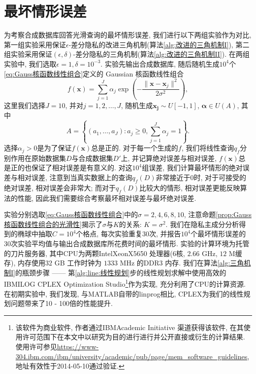 \section{最坏情形误差} %
\label{sec:最坏情形误差}
为考察合成数据库回答光滑查询的最坏情形误差, 我们进行以下两组实验作为对比, 第一组实验采用保证$\epsilon$-差分隐私的改进三角机制(算法\ref{alg:改进的三角机制I}), 第二组实验采用保证$(\epsilon, \delta)$-差分隐私的三角机制(算法\ref{alg:改进的三角机制II}). 在两组实验中, 我们选取$\epsilon = 1, \delta = 10^{-3}$. 实验先输出合成数据库, 随后随机生成$10^4$个\eqref{eq:Gauss核函数线性组合}定义的 Gaussian 核函数线性组合
\[
  f(\mathbf{x}) = \sum_{j = 1}^J \alpha_j \exp\left(-\frac{\|\mathbf{x} - \mathbf{x}_j\|^2}{2\sigma^2}\right), 
\]
这里我们选择$J = 10$, 并对$j = 1, 2, \dots, J$, 随机生成$\mathbf{x_j} \sim U[-1, 1]$, $\boldsymbol{\alpha} \in U(A)$, 其中
\[
  A = \left\{(a_1, \dots, a_J)\colon a_j\ge 0, \sum_{j=1}^J \alpha_j = 1 \right\}.
\]
选择$\alpha_j > 0$是为了保证$f(\mathbf{x})$总是正的. 对于每一个生成的$f$, 我们将线性查询$q_f$分别作用在原始数据集$D$与合成数据集$D'$上, 并记算绝对误差与相对误差, $f(\mathbf{x})$总是正的也保证了相对误差是有意义的.  对这$10^4$组误差, 我们计算最坏情形的绝对误差与相对误差, 注意到当真实数据上的查询$q_f(D)$非常接近于$0$时, 对于可接受的绝对误差, 相对误差会非常大; 而对于$q_f(D)$比较大的情形, 相对误差更能反映算法的性能, 因此我们需要综合考察最坏相对误差与最坏绝对误差. 

实验分别选取\eqref{eq:Gauss核函数线性组合}中的$\sigma = 2, 4, 6, 8, 10$, 注意命题\ref{prop:Gauss 核函数线性组合的光滑性}揭示了$\sigma$与$K$的关系: $K = \sigma^2$. 我们在隐私主成分分析得到的椭球中抽取$C = 10^4$个格点, 每次实验重复$30$次, 并报告$10^4$个最坏情形误差的$30$次实验平均值与输出合成数据库所花费时间的最坏情形. 实验的计算环境为托管的刀片服务器, 其中CPU为两颗Intel\textregistered Xeon\textregistered X5650 处理器($6$核, $2.66$ GHz, $12$ M缓存), 内存使用$32$ GB 工作时钟为 $1333$ MHz 的DDR3 内存. 我们在算法\ref{alg:三角机制I}的瓶颈步骤 ------ 第\ref{alg:line:线性规划}步的线性规划求解中使用高效的IBM\textregistered ILOG CPLEX Optimization Studio\footnote{该软件为商业软件, 作者通过IBM\textregistered Academic Initiative 渠道获得该软件, 在其使用许可范围下在本文中以研究为目的进行进行并公开直接或衍生的计算结果. 使用许可参见\url{https://www-304.ibm.com/ibm/university/academic/pub/page/mem_software_guidelines}, 地址有效性于2014-05-10通过验证.}作为实现, 充分利用了CPU的计算资源. 在初期实验中, 我们发现, 与MATLAB自带的{\ttfamily linprog}相比, CPLEX为我们的线性规划问题带来了10 - 100倍的性能提升.

